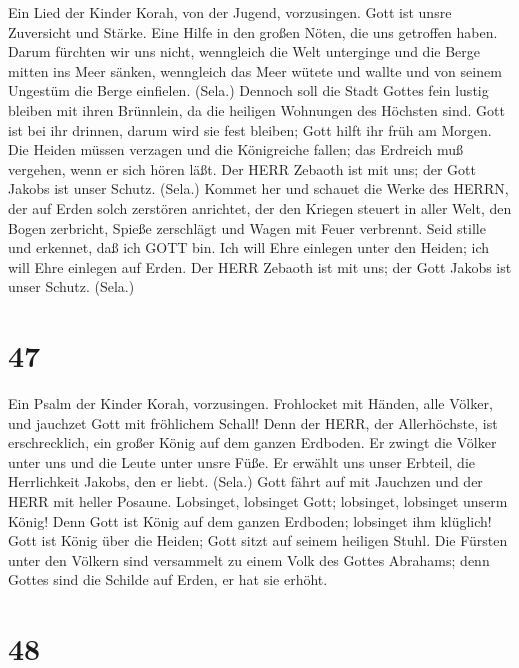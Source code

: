 Ein Lied der Kinder Korah, von der Jugend, vorzusingen.
Gott ist unsre Zuversicht und Stärke. Eine Hilfe in den großen Nöten,
die uns getroffen haben.  Darum fürchten wir uns nicht,
wenngleich die Welt unterginge und die Berge mitten ins Meer sänken,
 wenngleich das Meer wütete und wallte und von seinem
Ungestüm die Berge einfielen. (Sela.)  Dennoch soll die
Stadt Gottes fein lustig bleiben mit ihren Brünnlein, da die heiligen
Wohnungen des Höchsten sind.  Gott ist bei ihr drinnen,
darum wird sie fest bleiben; Gott hilft ihr früh am Morgen. 
Die Heiden müssen verzagen und die Königreiche fallen; das Erdreich muß
vergehen, wenn er sich hören läßt.  Der HERR Zebaoth ist mit
uns; der Gott Jakobs ist unser Schutz. (Sela.)  Kommet her
und schauet die Werke des HERRN, der auf Erden solch zerstören
anrichtet,  der den Kriegen steuert in aller Welt, den Bogen
zerbricht, Spieße zerschlägt und Wagen mit Feuer verbrennt.
 Seid stille und erkennet, daß ich GOTT bin. Ich will Ehre
einlegen unter den Heiden; ich will Ehre einlegen auf Erden.
 Der HERR Zebaoth ist mit uns; der Gott Jakobs ist unser
Schutz. (Sela.)

\hypertarget{section-46}{%
\section{47}\label{section-46}}

 Ein Psalm der Kinder Korah, vorzusingen. Frohlocket mit
Händen, alle Völker, und jauchzet Gott mit fröhlichem Schall!
 Denn der HERR, der Allerhöchste, ist erschrecklich, ein
großer König auf dem ganzen Erdboden.  Er zwingt die Völker
unter uns und die Leute unter unsre Füße.  Er erwählt uns
unser Erbteil, die Herrlichkeit Jakobs, den er liebt. (Sela.)
 Gott fährt auf mit Jauchzen und der HERR mit heller
Posaune.  Lobsinget, lobsinget Gott; lobsinget, lobsinget
unserm König!  Denn Gott ist König auf dem ganzen Erdboden;
lobsinget ihm klüglich!  Gott ist König über die Heiden;
Gott sitzt auf seinem heiligen Stuhl.  Die Fürsten unter den
Völkern sind versammelt zu einem Volk des Gottes Abrahams; denn Gottes
sind die Schilde auf Erden, er hat sie erhöht.

\hypertarget{section-47}{%
\section{48}\label{section-47}}

